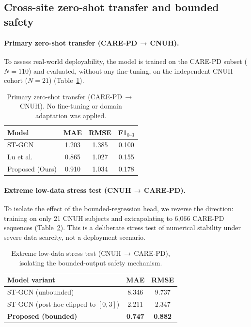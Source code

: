 \documentclass[preprint,12pt]{elsarticle}
\begin{document}
\subsection{Cross-site zero-shot transfer and bounded safety}
\label{sec:crossds}

\paragraph{Primary zero-shot transfer (CARE-PD\,$\to$\,CNUH).}
To assess real-world deployability, the model is trained on the CARE-PD subset
($N=110$) and evaluated, without any fine-tuning, on the independent CNUH cohort
($N=21$) (Table~\ref{tab:zero_primary}).

\begin{table}[htpb]
\centering
\caption{Primary zero-shot transfer (CARE-PD\,$\to$\,CNUH). No fine-tuning or
domain adaptation was applied.}
\label{tab:zero_primary}
\begin{tabular}{lccc}
\toprule
\textbf{Model} & \textbf{MAE} & \textbf{RMSE} & \textbf{F1$_{0\text{--}3}$} \\
\midrule
ST-GCN \cite{yan2018spatial}      & 1.203 & 1.385 & 0.100 \\
Lu et al.\ \cite{lu2020vision}    & 0.865 & 1.027 & 0.155 \\
Proposed (Ours)          & 0.910 & 1.034 & 0.178 \\
\bottomrule
\end{tabular}
\end{table}

\paragraph{Extreme low-data stress test (CNUH\,$\to$\,CARE-PD).}
To isolate the effect of the bounded-regression head, we reverse the direction:
training on only 21 CNUH subjects and extrapolating to 6{,}066 CARE-PD sequences
(Table~\ref{tab:zero_stress}). This is a deliberate stress test of numerical
stability under severe data scarcity, not a deployment scenario.

\begin{table}[htpb]
\centering
\caption{Extreme low-data stress test (CNUH\,$\to$\,CARE-PD), isolating the
bounded-output safety mechanism.}
\label{tab:zero_stress}
\begin{tabular}{lcc}
\toprule
\textbf{Model variant} & \textbf{MAE} & \textbf{RMSE} \\
\midrule
ST-GCN (unbounded)            & 8.346 & 9.737 \\
ST-GCN (post-hoc clipped to $[0,3]$)       & 2.211 & 2.347 \\
\textbf{Proposed (bounded)}   & \textbf{0.747} & \textbf{0.882} \\
\bottomrule
\end{tabular}
\end{table}
\end{document}
